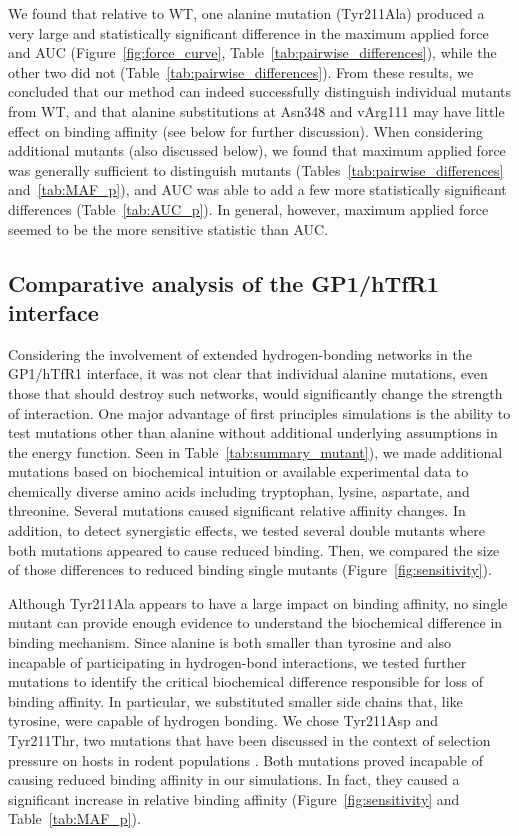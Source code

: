\documentclass[12pt]{article}
\begin{document}
We found that relative to WT, one alanine mutation (Tyr211Ala) produced a very large and statistically significant difference in the maximum applied force and AUC (Figure~\ref{fig:force_curve}, Table~\ref{tab:pairwise_differences}), while the other two did not (Table~\ref{tab:pairwise_differences}). From these results, we concluded that our method can indeed successfully distinguish individual mutants from WT, and that alanine substitutions at Asn348 and vArg111 may have little effect on binding affinity (see below for further discussion). When considering additional mutants (also discussed below), we found that maximum applied force was generally sufficient to distinguish mutants (Tables~\ref{tab:pairwise_differences} and~\ref{tab:MAF_p}), and AUC was able to add a few more statistically significant differences (Table~\ref{tab:AUC_p}). In general, however, maximum applied force seemed to be the more sensitive statistic than AUC.

\subsection*{Comparative analysis of the GP1/hTfR1 interface}
Considering the involvement of extended hydrogen-bonding networks in the GP1/hTfR1 interface, it was not clear that individual alanine mutations, even those that should destroy such networks, would significantly change the strength of interaction. One major advantage of first principles simulations is the ability to test mutations other than alanine without additional underlying assumptions in the energy function. Seen in Table~\ref{tab:summary_mutant}), we made additional mutations based on biochemical intuition or available experimental data to chemically diverse amino acids including tryptophan, lysine, aspartate, and threonine. Several mutations caused significant relative affinity changes. In addition, to detect synergistic effects, we tested several double mutants where both mutations appeared to cause reduced binding. Then, we compared the size of those differences to reduced binding single mutants (Figure~\ref{fig:sensitivity}).

Although Tyr211Ala appears to have a large impact on binding affinity, no single mutant can provide enough evidence to understand the biochemical difference in binding mechanism. Since alanine is both smaller than tyrosine and also incapable of participating in hydrogen-bond interactions, we tested further mutations to identify the critical biochemical difference responsible for loss of binding affinity. In particular, we substituted smaller side chains that, like tyrosine, were capable of hydrogen bonding. We chose Tyr211Asp and Tyr211Thr, two mutations that have been discussed in the context of selection pressure on hosts in rodent populations \citep{Rad2008,Rad20111,Rad20112}. Both mutations proved incapable of causing reduced binding affinity in our simulations. In fact, they caused a significant increase in relative binding affinity (Figure~\ref{fig:sensitivity} and Table~\ref{tab:MAF_p}).
\end{document}
